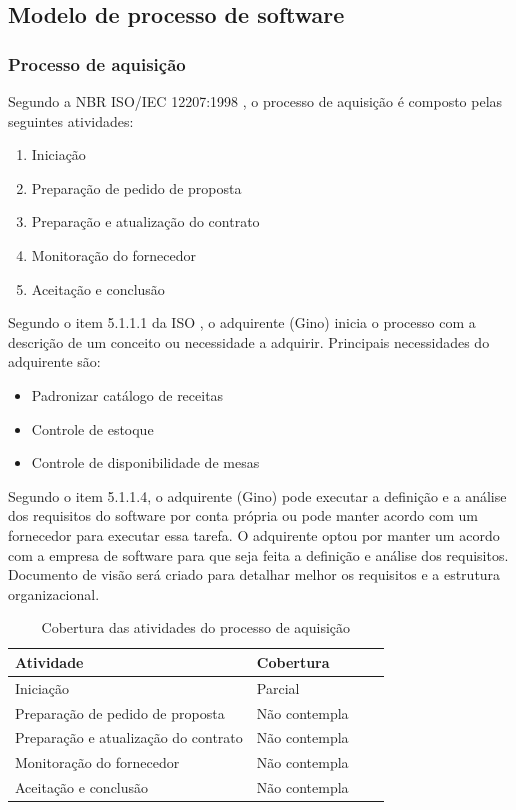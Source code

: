 \subsection{Modelo de processo de software}

\subsubsection{\large{Processo de aquisição}}

Segundo a NBR ISO/IEC 12207:1998 \cite{iso12207:95}, o processo de aquisição é composto pelas seguintes atividades:

\begin{enumerate}
  \item Iniciação
  \item Preparação de pedido de proposta
  \item Preparação e atualização do contrato
  \item Monitoração do fornecedor
  \item Aceitação e conclusão
\end{enumerate}

Segundo o item 5.1.1.1 da ISO \cite{iso12207:95}, o adquirente (Gino) inicia o processo com a
descrição de um conceito ou necessidade a adquirir. Principais necessidades do adquirente são:

\begin{itemize}
  \item Padronizar catálogo de receitas
  \item Controle de estoque
  \item Controle de disponibilidade de mesas
\end{itemize}

Segundo o item 5.1.1.4, o adquirente (Gino) pode executar a definição e a análise dos requisitos do software por conta própria ou pode manter acordo com um fornecedor para executar essa tarefa. O adquirente optou por manter um acordo com a empresa de software para que seja feita a definição e análise dos requisitos. Documento de visão será criado para detalhar melhor os requisitos e a estrutura organizacional.

\begin{table}[htb]
      \begin{center}
        \begin{tabular}{| l | l | l | l |}
        \hline
        \textbf{Atividade} & \textbf{Cobertura} \\ \hline
        Iniciação & Parcial \\ \hline
        Preparação de pedido de proposta & Não contempla \\ \hline
        Preparação e atualização do contrato & Não contempla \\ \hline
        Monitoração do fornecedor & Não contempla \\ \hline
        Aceitação e conclusão & Não contempla \\ \hline
        \end{tabular}
      \end{center}
    \caption{Cobertura das atividades do processo de aquisição}
    \end{table}



